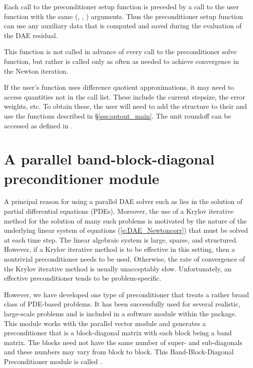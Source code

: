 {{  Each call to the preconditioner setup function is preceded by a call to the
   user function with the same (, , ) arguments.  
  Thus the preconditioner setup function can use any auxiliary data that is 
  computed and saved during the evaluation of the DAE residual.
  
  This function is not called in advance of every call to the preconditioner solve
  function, but rather is called only as often as needed to achieve convergence in
  the Newton iteration.

  If the user's  function uses difference quotient
  approximations, it may need to access quantities not in the call
  list. These include the current stepsize, the error weights, etc.
  To obtain these, the user will need to add the  
  structure to their  and use the  
  functions described in
  \S\ref{sss:optout_main}. The unit roundoff can be accessed
  as  defined in .

}


\section{A parallel band-block-diagonal preconditioner module}\label{sss:idabbdpre}

A principal reason for using a parallel DAE solver such as {\ida} lies
in the solution of partial differential equations (PDEs).  Moreover,
the use of a Krylov iterative method for the solution of many such
problems is motivated by the nature of the underlying linear system of
equations (\ref{e:DAE_Newtoncorr}) that must be solved at each time step.  The
linear algebraic system is large, sparse, and structured. However, if
a Krylov iterative method is to be effective in this setting, then a
nontrivial preconditioner needs to be used.  Otherwise, the rate of
convergence of the Krylov iterative method is usually unacceptably
slow.  Unfortunately, an effective preconditioner tends to be
problem-specific.

However, we have developed one type of preconditioner that treats a
rather broad class of PDE-based problems.  It has been successfully
used for several realistic, large-scale problems \cite{HiTa:98} and is
included in a software module within the {\ida} package. This module
works with the parallel vector module {\nvecp} and 
generates a preconditioner that is a block-diagonal matrix with each
block being a band matrix. The blocks need not have the same number of
super- and sub-diagonals and these numbers may vary from block to
block. This Band-Block-Diagonal Preconditioner module is called
{\idabbdpre}.

}
